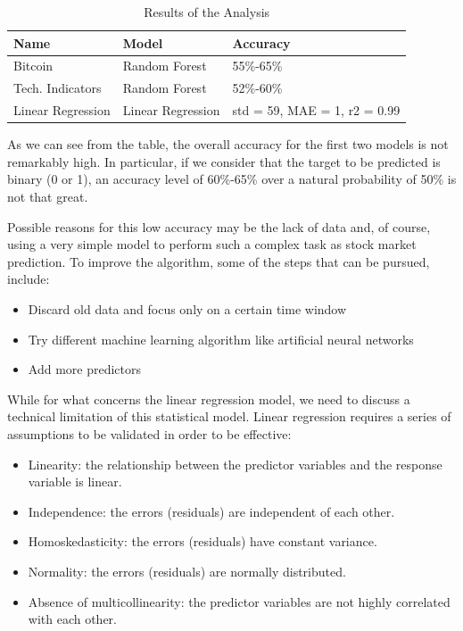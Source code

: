 \documentclass[conference,compsoc]{IEEEtran}
\begin{document}
\begin{table}[ht]
\renewcommand{\arraystretch}{1.3}
\caption{Results of the Analysis}
\label{results}
\centering
\begin{tabular}{|m{8em}|m{8em}|m{8em}|}
    \hline
    \textbf{Name} & \textbf{Model} & \textbf{Accuracy}\\
    \hline
    Bitcoin & Random Forest & 55\%-65\% \\
    \hline
    Tech. Indicators & Random Forest & 52\%-60\% \\
    \hline
    Linear Regression & Linear Regression & std = 59, MAE = 1, r2 = 0.99 \\
    \hline
\end{tabular}
\end{table}

As we can see from the table, the overall accuracy for the first two models is not remarkably high.
%
In particular, if we consider that the target to be predicted is binary (0 or 1), an accuracy level of 60\%-65\% over a natural probability of 50\% is not that great.

Possible reasons for this low accuracy may be the lack of data and, of course, using a very simple model to perform such a complex task as stock market prediction.
%
To improve the algorithm, some of the steps that can be pursued, include:

\begin{itemize}
    \item Discard old data and focus only on a certain time window
    \item Try different machine learning algorithm like artificial neural networks
    \item Add more predictors 
\end{itemize}

While for what concerns the linear regression model, we need to discuss a technical limitation of this statistical model.
%
Linear regression requires a series of assumptions to be validated in order to be effective:

\begin{itemize}
    \item Linearity: the relationship between the predictor variables and the response variable is linear.
    \item Independence: the errors (residuals) are independent of each other.
    \item Homoskedasticity: the errors (residuals) have constant variance.
    \item Normality: the errors (residuals) are normally distributed.
    \item Absence of multicollinearity: the predictor variables are not highly correlated with each other.
\end{itemize}
\end{document}
